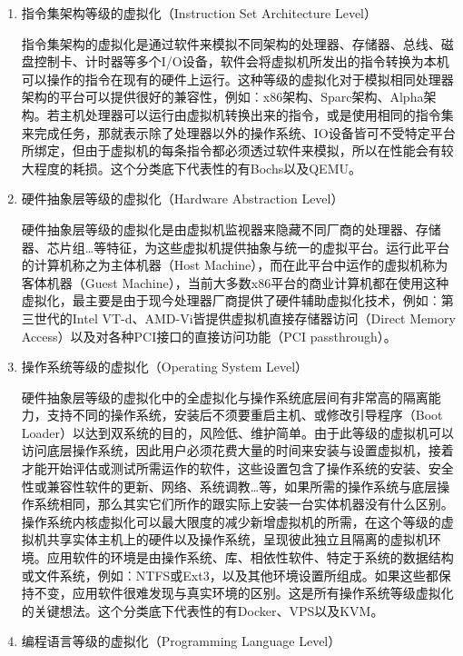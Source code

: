 \begin{enumerate}
    \item 指令集架构等级的虚拟化（Instruction Set Architecture Level）

      \hspace{2em} 指令集架构的虚拟化是通过软件来模拟不同架构的处理器、存储器、总线、磁盘控制卡、计时器等多个I/O设备，软件会将虚拟机所发出的指令转换为本机可以操作的指令在现有的硬件上运行。这种等级的虚拟化对于模拟相同处理器架构的平台可以提供很好的兼容性，例如︰x86架构、Sparc架构、Alpha架构。若主机处理器可以运行由虚拟机转换出来的指令，或是使用相同的指令集来完成任务，那就表示除了处理器以外的操作系统、IO设备皆可不受特定平台所绑定，但由于虚拟机的每条指令都必须透过软件来模拟，所以在性能会有较大程度的耗损。这个分类底下代表性的有Bochs以及QEMU。
    \item 硬件抽象层等级的虚拟化（Hardware Abstraction Level）

      \hspace{2em} 硬件抽象层等级的虚拟化是由虚拟机监视器来隐藏不同厂商的处理器、存储器、芯片组…等特征，为这些虚拟机提供抽象与统一的虚拟平台。运行此平台的计算机称之为主体机器（Host Machine），而在此平台中运作的虚拟机称为客体机器（Guest Machine），当前大多数x86平台的商业计算机都在使用这种虚拟化，最主要是由于现今处理器厂商提供了硬件辅助虚拟化技术，例如︰第三世代的Intel VT-d、AMD-Vi皆提供虚拟机直接存储器访问（Direct Memory Access）以及对各种PCI接口的直接访问功能（PCI passthrough）。
    \item 操作系统等级的虚拟化（Operating System Level）

      \hspace{2em} 硬件抽象层等级的虚拟化中的全虚拟化与操作系统底层间有非常高的隔离能力，支持不同的操作系统，安装后不须要重启主机、或修改引导程序（Boot Loader）以达到双系统的目的，风险低、维护简单。由于此等级的虚拟机可以访问底层操作系统，因此用户必须花费大量的时间来安装与设置虚拟机，接着才能开始评估或测试所需运作的软件，这些设置包含了操作系统的安装、安全性或兼容性软件的更新、网络、系统调教…等，如果所需的操作系统与底层操作系统相同，那么其实它们所作的跟实际上安装一台实体机器没有什么区别。操作系统内核虚拟化可以最大限度的减少新增虚拟机的所需，在这个等级的虚拟机共享实体主机上的硬件以及操作系统，呈现彼此独立且隔离的虚拟机环境。应用软件的环境是由操作系统、库、相依性软件、特定于系统的数据结构或文件系统，例如︰NTFS或Ext3，以及其他环境设置所组成。如果这些都保持不变，应用软件很难发现与真实环境的区别。这是所有操作系统等级虚拟化的关键想法。这个分类底下代表性的有Docker、VPS以及KVM。
    \item 编程语言等级的虚拟化（Programming Language Level）


\end{enumerate}
